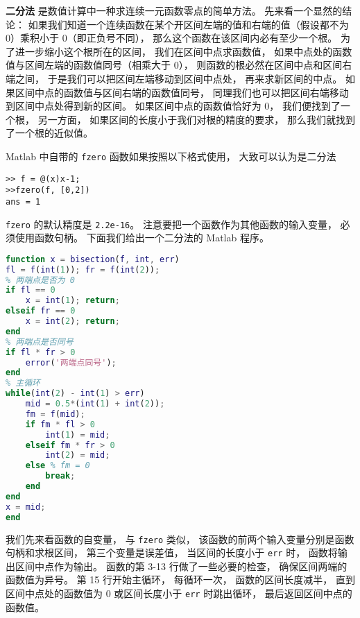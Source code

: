 
\textbf{二分法} 是数值计算中一种求连续一元函数零点的简单方法。 先来看一个显然的结论： 如果我们知道一个连续函数在某个开区间左端的值和右端的值（假设都不为 0）乘积小于 0（即正负号不同）， 那么这个函数在该区间内必有至少一个根。 为了进一步缩小这个根所在的区间， 我们在区间中点求函数值， 如果中点处的函数值与区间左端的函数值同号（相乘大于 0）， 则函数的根必然在区间中点和区间右端之间， 于是我们可以把区间左端移动到区间中点处， 再来求新区间的中点。 如果区间中点的函数值与区间右端的函数值同号， 同理我们也可以把区间右端移动到区间中点处得到新的区间。 如果区间中点的函数值恰好为 0， 我们便找到了一个根， 另一方面， 如果区间的长度小于我们对根的精度的要求， 那么我们就找到了一个根的近似值。

Matlab 中自带的 \verb|fzero| 函数如果按照以下格式使用， 大致可以认为是二分法
\begin{lstlisting}[language=matlabC]
>> f = @(x)x-1;
>>fzero(f, [0,2])
ans = 1
\end{lstlisting}
\verb|fzero| 的默认精度是 \verb|2.2e-16|。 注意要把一个函数作为其他函数的输入变量， 必须使用函数句柄。 下面我们给出一个二分法的 Matlab 程序。

\begin{lstlisting}[language=matlab, caption=bisection.m]
% 二分法求函数的根
function x = bisection(f, int, err)
fl = f(int(1)); fr = f(int(2));
% 两端点是否为 0
if fl == 0
    x = int(1); return;
elseif fr == 0
    x = int(2); return;
end
% 两端点是否同号
if fl * fr > 0
    error('两端点同号');
end
% 主循环
while(int(2) - int(1) > err)
    mid = 0.5*(int(1) + int(2));
    fm = f(mid);
    if fm * fl > 0
        int(1) = mid;
    elseif fm * fr > 0
        int(2) = mid;
    else % fm = 0
        break;
    end
end
x = mid;
end
\end{lstlisting}

我们先来看函数的自变量， 与 \verb|fzero| 类似， 该函数的前两个输入变量分别是函数句柄和求根区间， 第三个变量是误差值， 当区间的长度小于 \verb|err| 时， 函数将输出区间中点作为输出。 函数的第 3-13 行做了一些必要的检查， 确保区间两端的函数值为异号。 第 15 行开始主循环， 每循环一次， 函数的区间长度减半， 直到区间中点处的函数值为 0 或区间长度小于 \verb|err| 时跳出循环， 最后返回区间中点的函数值。
